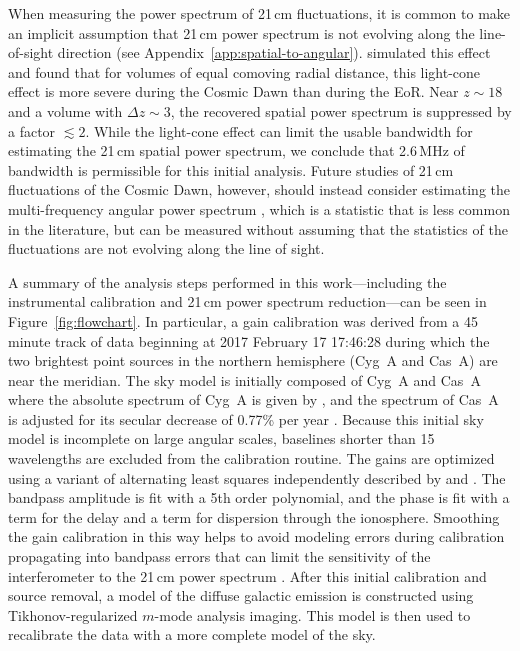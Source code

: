 \begin{bibunit}
When measuring the power spectrum of 21\,cm fluctuations, it is common to make an implicit
assumption that 21\,cm power spectrum is not evolving along the line-of-sight direction (see
Appendix~\ref{app:spatial-to-angular}).  \citet{2018MNRAS.477.3217G} simulated this effect and found
that for volumes of equal comoving radial distance, this light-cone effect is more severe during the
Cosmic Dawn than during the EoR.  Near $z \sim 18$ and a volume with $\Delta z \sim 3$, the
recovered spatial power spectrum is suppressed by a factor $\lesssim 2$. While the light-cone effect
can limit the usable bandwidth for estimating the 21\,cm spatial power spectrum, we conclude that
2.6\,MHz of bandwidth is permissible for this initial analysis. Future studies of 21\,cm
fluctuations of the Cosmic Dawn, however, should instead consider estimating the multi-frequency
angular power spectrum \citep{2007MNRAS.378..119D}, which is a statistic that is less common in the
literature, but can be measured without assuming that the statistics of the fluctuations are not
evolving along the line of sight.

A summary of the analysis steps performed in this work---including the instrumental calibration and
21\,cm power spectrum reduction---can be seen in Figure~\ref{fig:flowchart}.  In particular, a gain
calibration was derived from a 45\,minute track of data beginning at 2017 February 17 17:46:28
during which the two brightest point sources in the northern hemisphere (Cyg~A and Cas~A) are near
the meridian. The sky model is initially composed of Cyg~A and Cas~A where the absolute spectrum of
Cyg~A is given by \citet{1977A&A....61...99B}, and the spectrum of Cas~A is adjusted for its secular
decrease of 0.77\% per year \citep{2009AJ....138..838H}. Because this initial sky model is
incomplete on large angular scales, baselines shorter than 15 wavelengths are excluded from the
calibration routine.  The gains are optimized using a variant of alternating least squares
independently described by \citet{2008ISTSP...2..707M} and \citet{2014A&A...571A..97S}.  The
bandpass amplitude is fit with a 5th order polynomial, and the phase is fit with a term for the
delay and a term for dispersion through the ionosphere. Smoothing the gain calibration in this way
helps to avoid modeling errors during calibration propagating into bandpass errors that can limit
the sensitivity of the interferometer to the 21\,cm power spectrum \citep{2016MNRAS.461.3135B,
2017MNRAS.470.1849E}. After this initial calibration and source removal, a model of the diffuse
galactic emission is constructed using Tikhonov-regularized $m$-mode analysis imaging. This model is
then used to recalibrate the data with a more complete model of the sky.


\end{bibunit}
